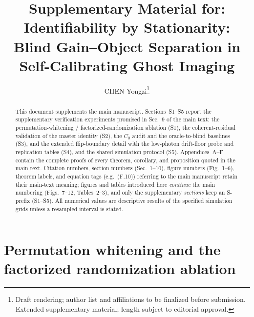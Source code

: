 \documentclass[journal,twoside]{IEEEtran}
\begin{document}
\title{Supplementary Material for: Identifiability by Stationarity: Blind Gain--Object Separation in Self-Calibrating Ghost Imaging}

\author{%
CHEN Yongzi\thanks{Draft rendering; author list and affiliations to be finalized before submission. Extended supplementary material; length subject to editorial approval.}%
}


\maketitle

\setcounter{figure}{6}
\setcounter{table}{1}

\begin{abstract}
This document supplements the main manuscript. Sections~S1--S5 report the supplementary verification experiments promised in Sec.~9 of the main text: the permutation-whitening / factorized-randomization ablation (S1), the coherent-residual validation of the master identity (S2), the $C_0$ audit and the oracle-to-blind baselines (S3), and the extended flip-boundary detail with the low-photon drift-floor probe and replication tables (S4), and the shared simulation protocol (S5). Appendices~A--F contain the complete proofs of every theorem, corollary, and proposition quoted in the main text. Citation numbers, section numbers (Sec.~1--10), figure numbers (Fig.~1--6), theorem labels, and equation tags (e.g.\ (F.10)) referring to the main manuscript retain their main-text meaning; figures and tables introduced here \emph{continue} the main numbering (Figs.~7--12, Tables~2--3), and only the supplementary \emph{sections} keep an S-prefix (S1--S5). All numerical values are descriptive results of the specified simulation grids unless a resampled interval is stated.
\end{abstract}

\section{Permutation whitening and the factorized randomization ablation}
\label{sec:s1}
\end{document}
